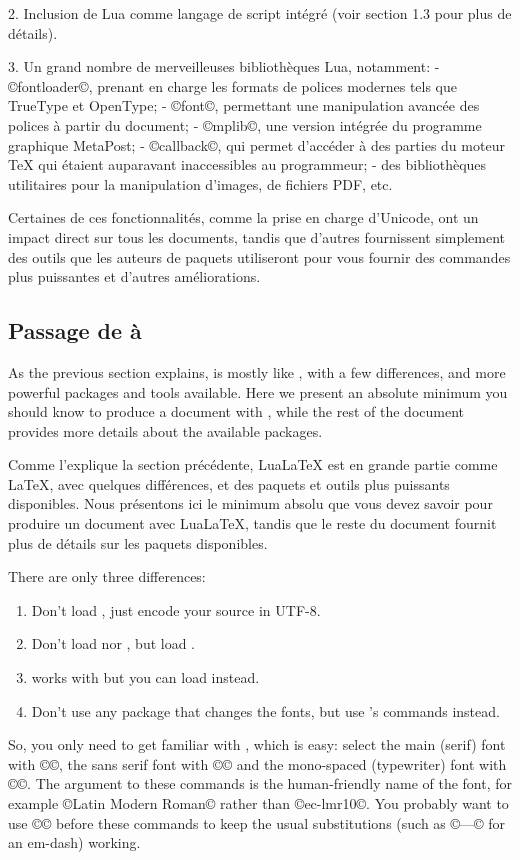 \documentclass{lltxdoc}
\begin{document}
2. Inclusion de Lua comme langage de script intégré (voir section 1.3 pour plus de détails).

3. Un grand nombre de merveilleuses bibliothèques Lua, notamment:
- ©fontloader©, prenant en charge les formats de polices modernes tels que TrueType et OpenType;
- ©font©, permettant une manipulation avancée des polices à partir du document;
- ©mplib©, une version intégrée du programme graphique MetaPost;
- ©callback©, qui permet d'accéder à des parties du moteur TeX qui étaient auparavant inaccessibles au programmeur;
- des bibliothèques utilitaires pour la manipulation d'images, de fichiers PDF, etc.

Certaines de ces fonctionnalités, comme la prise en charge d'Unicode, ont un impact direct sur tous les documents, tandis que d'autres fournissent simplement des outils que les auteurs de paquets utiliseront pour vous fournir des commandes plus puissantes et d'autres améliorations.

\subsection{Passage de \latex à \lualatex}\label{switch}

As the previous section explains, \lualatex is mostly like \latex, with a few
differences, and more powerful packages and tools available. Here we present
an absolute minimum you should know to produce a document with \lualatex, while
the rest of the document provides more details about the available packages.

Comme l'explique la section précédente, LuaLaTeX est en grande partie comme LaTeX, avec quelques différences, et des paquets et outils plus puissants disponibles. Nous présentons ici le minimum absolu que vous devez savoir pour produire un document avec LuaLaTeX, tandis que le reste du document fournit plus de détails sur les paquets disponibles.

There are only three differences:
\begin{enumerate}
  \item Don't load , just encode your source in UTF-8.
  \item Don't load  nor , but load .
  \item {} works with \lualatex{} but you can load  instead.
  \item Don't use any package that changes the fonts, but use 's
    commands instead.
\end{enumerate}
So, you only need to get familiar with , which is
easy: select the main (serif) font with ©\setmainfont©, the sans serif font
with ©\setsansfont© and the mono-spaced (typewriter) font with ©\setmonofont©.
The argument to these commands is the human-friendly name of the font, for
example ©Latin Modern Roman© rather than ©ec-lmr10©. You probably want to use
©© before these commands to keep the usual
\tex substitutions (such as ©---© for an em-dash) working.
\end{document}
